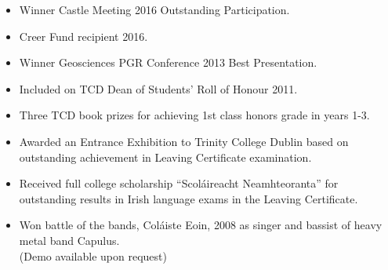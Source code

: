 \documentclass[11pt]{article}
\newenvironment{resumeSubSectionBody}{
    \par
    \vspace{-0.8\parskip}
    \begin{small}
    \par
} {
    \par
    \end{small}
    \par
}
\begin{document}
%
%
\begin{resumeSubSectionBody}

    \begin{itemize}
        \setlength\itemsep{0em}
        \setlength\parskip{0em}
        \item
            Winner Castle Meeting 2016 Outstanding Participation.

        \item
            Creer Fund recipient 2016.

        \item
            Winner Geosciences PGR Conference 2013 Best Presentation.

        \item
            Included on TCD Dean of Students' Roll of Honour 2011.

        \item
            Three TCD book prizes for achieving 1st class honors grade in
            years 1-3.

        \item
            Awarded an Entrance Exhibition to Trinity College Dublin
            based on outstanding achievement in Leaving Certificate
            examination.

        \item
            Received full college scholarship ``Scol\'aireacht Neamhteoranta''
            for outstanding results in Irish language exams in the
            Leaving Certificate.

        \item
            Won battle of the bands, Col\'aiste Eoin, 2008 as singer and bassist
            of heavy metal band Capulus. \\
            (Demo available upon request)

    \end{itemize}

\end{resumeSubSectionBody}


\end{document}
